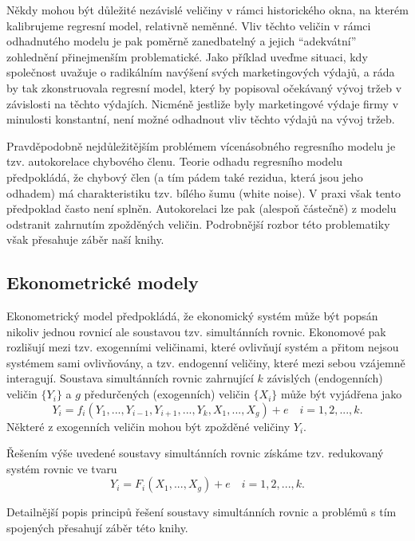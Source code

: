 Někdy mohou být důležité nezávislé veličiny v rámci historického okna, na kterém kalibrujeme regresní model, relativně neměnné. Vliv těchto veličin v rámci odhadnutého modelu je pak poměrně zanedbatelný a jejich ``adekvátní'' zohlednění přinejmenším problematické. Jako příklad uveďme situaci, kdy společnost uvažuje o radikálním navýšení svých marketingových výdajů, a ráda by tak zkonstruovala regresní model, který by popisoval očekávaný vývoj tržeb v závislosti na těchto výdajích. Nicméně jestliže byly marketingové výdaje firmy v minulosti konstantní, není možné odhadnout vliv těchto výdajů na vývoj tržeb.

Pravděpodobně nejdůležitějším problémem vícenásobného regresního modelu je tzv. autokorelace chybového členu. Teorie odhadu regresního modelu předpokládá, že chybový člen (a tím pádem také rezidua, která jsou jeho odhadem) má charakteristiku tzv. bílého šumu (white noise). V praxi však tento předpoklad často není splněn. Autokorelaci lze pak (alespoň částečně) z modelu odstranit zahrnutím zpožděných veličin. Podrobnější rozbor této problematiky však přesahuje záběr naší knihy.

\subsection{Ekonometrické modely}

Ekonometrický model předpokládá, že ekonomický systém může být popsán nikoliv jednou rovnicí ale soustavou tzv. simultánních rovnic. Ekonomové pak rozlišují mezi tzv. exogenními veličinami, které ovlivňují systém a přitom nejsou systémem sami ovlivňovány, a tzv. endogenní veličiny, které mezi sebou vzájemně interagují. Soustava simultánních rovnic zahrnující $k$ závislých (endogenních) veličin $\{Y_i\}$ a $g$ předurčených (exogenních) veličin $\{X_i\}$ může být vyjádřena jako
\begin{equation}
Y_i = f_i(Y_1, ..., Y_{i - 1}, Y_{i + 1}, ..., Y_{k}, X_1, ..., X_g) + e \quad i = 1, 2, ..., k.
\end{equation}
Některé z exogenních veličin mohou být zpožděné veličiny $Y_i$.

Řešením výše uvedené soustavy simultánních rovnic získáme tzv. redukovaný systém rovnic ve tvaru
\begin{equation}
Y_i = F_i(X_1, ..., X_g) + e \quad i = 1, 2, ..., k.
\end{equation}

Detailnější popis principů řešení soustavy simultánních rovnic a problémů s tím spojených přesahují záběr této knihy.

